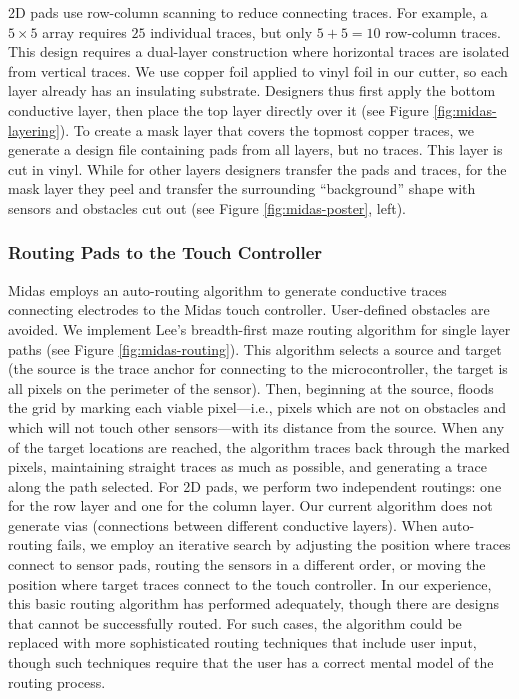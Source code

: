 2D pads use row-column scanning to reduce connecting traces.
For example, a $5 × 5$ array requires $25$ individual traces, but
only $5 + 5 = 10$ row-column traces. This design requires a
dual-layer construction where horizontal traces are isolated
from vertical traces. We use copper foil applied to vinyl foil
in our cutter, so each layer already has an insulating substrate.
Designers thus first apply the bottom conductive layer,
then place the top layer directly over it (see Figure \ref{fig:midas-layering}).
To create a mask layer that covers the topmost copper traces,
we generate a design file containing pads from all layers, but
no traces. This layer is cut in vinyl. While for other layers
designers transfer the pads and traces, for the mask layer they
peel and transfer the surrounding “background” shape with
sensors and obstacles cut out (see Figure \ref{fig:midas-poster}, left).


        \subsubsection{Routing Pads to the Touch Controller}
Midas employs an auto-routing algorithm to generate conductive
traces connecting electrodes to the Midas touch controller.
User-defined obstacles are avoided. We implement
Lee's breadth-first maze routing algorithm for single layer
paths \cite{lee-maze} (see Figure \ref{fig:midas-routing}). This algorithm selects a source and target (the source is the trace anchor for connecting to the microcontroller, the target is all pixels on the perimeter of the sensor). Then, beginning at the source, floods the grid by marking each viable pixel---i.e., pixels which are not on obstacles and which will not touch other sensors---with its distance from the source. When any of the target locations are reached, the algorithm traces back through the marked pixels, maintaining straight traces as much as possible, and generating a trace along the path selected. For 2D pads, we perform two independent routings:
one for the row layer and one for the column layer. Our
current algorithm does not generate vias (connections between
different conductive layers). When auto-routing fails,
we employ an iterative search by adjusting the position where
traces connect to sensor pads, routing the sensors in a different
order, or moving the position where target traces connect
to the touch controller. In our experience, this basic routing
algorithm has performed adequately, though there are designs
that cannot be successfully routed. For such cases, the
algorithm could be replaced with more sophisticated routing
techniques that include user input, though such techniques
require that the user has a correct mental model of the routing
process.

